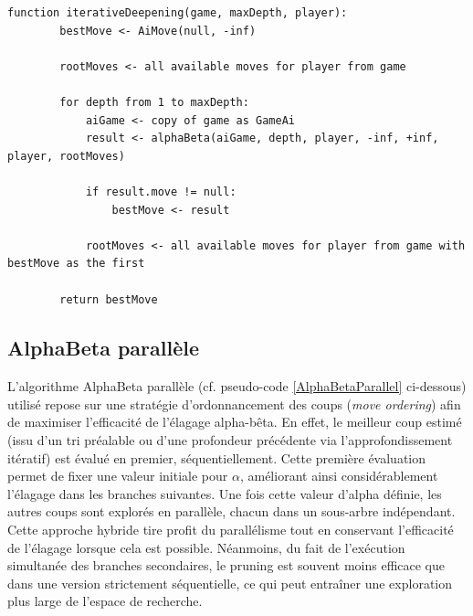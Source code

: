 \documentclass{article}
\begin{document}
\begin{lstlisting}[label={IterativeDeepening}, caption={Iterative Deepening avec AlphaBeta - pseudo-code}]
    function iterativeDeepening(game, maxDepth, player):
        bestMove <- AiMove(null, -inf)

        rootMoves <- all available moves for player from game
    
        for depth from 1 to maxDepth:
            aiGame <- copy of game as GameAi
            result <- alphaBeta(aiGame, depth, player, -inf, +inf, player, rootMoves)
    
            if result.move != null:
                bestMove <- result

            rootMoves <- all available moves for player from game with bestMove as the first
    
        return bestMove
    \end{lstlisting}
    

\subsection{AlphaBeta parallèle}

L'algorithme AlphaBeta parallèle (cf. pseudo-code \ref{AlphaBetaParallel} ci-dessous) utilisé repose sur une stratégie d'ordonnancement des coups (\textit{move ordering}) afin de maximiser l'efficacité de l'élagage alpha-bêta. En effet, le meilleur coup estimé (issu d'un tri préalable ou d'une profondeur précédente via l'approfondissement itératif) est évalué en premier, séquentiellement. Cette première évaluation permet de fixer une valeur initiale pour $\alpha$, améliorant ainsi considérablement l'élagage dans les branches suivantes. Une fois cette valeur d'alpha définie, les autres coups sont explorés en parallèle, chacun dans un sous-arbre indépendant.
Cette approche hybride tire profit du parallélisme tout en conservant l'efficacité de l'élagage lorsque cela est possible. Néanmoins, du fait de l'exécution simultanée des branches secondaires, le pruning est souvent moins efficace que dans une version strictement séquentielle, ce qui peut entraîner une exploration plus large de l'espace de recherche.
\end{document}

